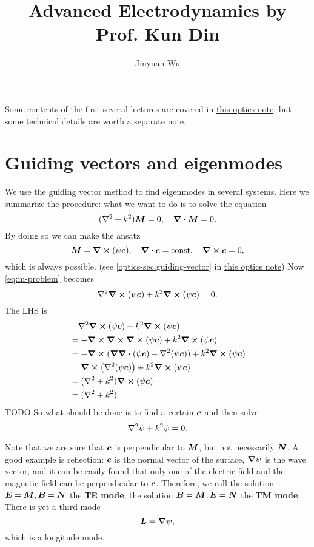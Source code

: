 \documentclass[hyperref, a4paper]{article}
\title{Advanced Electrodynamics by Prof. Kun Din}
\author{Jinyuan Wu}
\newcommand*{\const}{\mathrm{const}}
\newcommand*{\concept}[1]{{\textbf{#1}}}
\newcommand{\opticsdoc}{\href{../optics/optics.pdf}{this optics note}}
\begin{document}
\maketitle

Some contents of the first several lectures are covered in \opticsdoc,
but some technical details are worth a separate note.

\section{Guiding vectors and eigenmodes}

We use the guiding vector method to find eigenmodes in 
several systems. Here we summarize the procedure: what we want to do is to solve the equation 
\begin{equation}
    (\laplacian + k^2) \vb*{M} = 0, \quad \div{\vb*{M}} = 0.
    \label{eq:m-problem}
\end{equation}
By doing so we can make the ansatz 
\begin{equation}
    \vb*{M} = \curl(\psi \vb*{c}), \quad \div{\vb*{c}} = \const, \quad \curl{\vb*{c}} = 0, 
\end{equation}
which is always possible. (see \eqref{optics-sec:guiding-vector} in \opticsdoc) Now \eqref{eq:m-problem} 
becomes 
\[
    \laplacian \curl{(\psi \vb*{c})} + k^2 \curl{(\psi \vb*{c})} = 0.
\]
The LHS is 
\[
    \begin{aligned}
        &\quad \laplacian \curl{(\psi \vb*{c})} + k^2 \curl{(\psi \vb*{c})} \\
        &= - \curl{ \curl \curl (\psi \vb*{c})} + k^2 \curl{(\psi \vb*{c})} \\
        &= - \curl{(\grad{\div{(\psi \vb*{c})}} - \laplacian (\psi \vb*{c}))} + k^2 \curl{(\psi \vb*{c})} \\
        &= \curl(\laplacian(\psi \vb*{c})) + k^2 \curl{(\psi \vb*{c})} \\
        &= (\laplacian + k^2) \curl(\psi \vb*{c}) \\
        &= (\laplacian + k^2) 
    \end{aligned}
\]
TODO
So what should be done is to find a certain $\vb*{c}$ and then solve 
\begin{equation}
    \laplacian \psi + k^2 \psi = 0.
    \label{eq:scalar-helmholtz}
\end{equation}

Note that we are sure that $\vb*{c}$ is perpendicular to $\vb*{M}$, but not necessarily $\vb*{N}$.
A good example is reflection: $\vb*{c}$ is the normal vector of the surface, $\grad{\psi}$ is the 
wave vector, and it can be easily found that only one of the electric field and the magnetic field 
can be perpendicular to $\vb*{c}$.
Therefore, we call the solution $\vb*{E} = \vb*{M}, \vb*{B} = \vb*{N}$ the \concept{TE mode}, 
the solution $\vb*{B} = \vb*{M}, \vb*{E} = \vb*{N}$ the \concept{TM mode}. There is yet a third mode 
\begin{equation}
    \vb*{L} = \grad{\psi},
\end{equation} 
which is a longitude mode.
\end{document}
